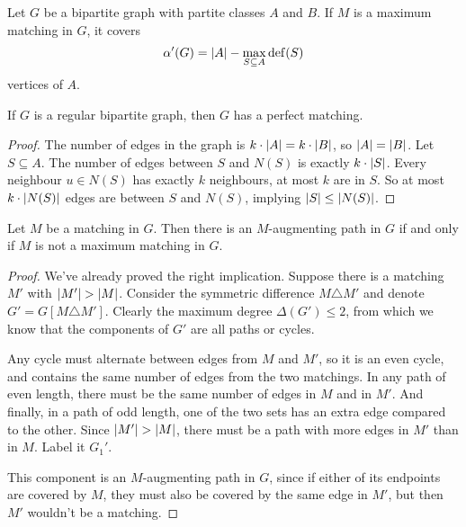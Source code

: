 \begin{theorem}
  Let $G$ be a bipartite graph with partite classes $A$ and $B$.
  If $M$ is a maximum matching in $G$, it covers
  \[
	\alpha'(G) = \left| A \right| - \max_{S \subseteq A} \operatorname{def}(S)
  \]
  vertices of $A$.
\end{theorem}

\begin{theorem}
  If $G$ is a regular bipartite graph, then $G$ has a perfect matching.
\end{theorem}

\begin{proof}
  The number of edges in the graph is $k \cdot \left| A \right| = k \cdot \left| B \right|$, so
  $\left| A \right| = \left| B \right|$.
  Let $S \subseteq A$.
  The number of edges between $S$ and $N(S)$ is exactly $k \cdot \left| S \right|$.
  Every neighbour $u \in N(S)$ has exactly $k$ neighbours, at most $k$ are in
  $S$.
  So at most $k \cdot \left| N(S) \right|$ edges are between $S$ and $N(S)$, implying
  $\left| S \right| \le \left| N(S) \right|$.
\end{proof}


\begin{theorem}
  Let $M$ be a matching in $G$.
  Then there is an $M$-augmenting path in $G$ if and only if $M$ is not a
  maximum matching in $G$.
\end{theorem}

\begin{proof}
  We've already proved the right implication.
  Suppose there is a matching $M'$ with $\left| M' \right| > \left| M \right|$.
  Consider the symmetric difference $M \triangle M'$ and denote $G' = G[M
  \triangle M']$.
  Clearly the maximum degree $\Delta(G') \le 2$, from which we know that the
  components of $G'$ are all paths or cycles.

  Any cycle must alternate between edges from $M$ and $M'$, so it is an even
  cycle, and contains the same number of edges from the two matchings.
  In any path of even length, there must be the same number of edges in $M$ and
  in $M'$.
  And finally, in a path of odd length, one of the two sets has an extra edge
  compared to the other.
  Since $\left| M' \right| > \left| M \right|$, there must be a path with more edges in $M'$ than
  in $M$.
  Label it $G_1'$.

  This component is an $M$-augmenting path in $G$, since if either of its
  endpoints are covered by $M$, they must also be covered by the same edge in
  $M'$, but then $M'$ wouldn't be a matching.
\end{proof}

